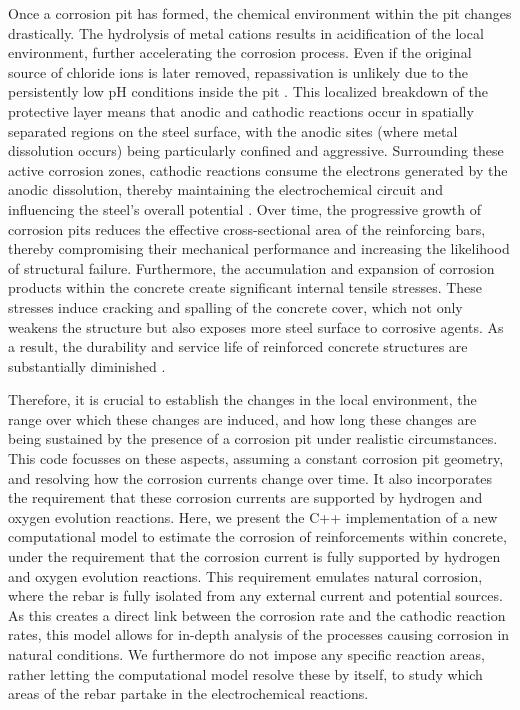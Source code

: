 \documentclass[3p]{elsarticle} %
\begin{document}
Once a corrosion pit has formed, the chemical environment within the pit changes drastically. The hydrolysis of metal cations results in acidification of the local environment, further accelerating the corrosion process. Even if the original source of chloride ions is later removed, repassivation is unlikely due to the persistently low pH conditions inside the pit \citep{Pourbaix1975, Taylor2018a, Li2021a, Turnbull1983, Pickering1972}. This localized breakdown of the protective layer means that anodic and cathodic reactions occur in spatially separated regions on the steel surface, with the anodic sites (where metal dissolution occurs) being particularly confined and aggressive. Surrounding these active corrosion zones, cathodic reactions consume the electrons generated by the anodic dissolution, thereby maintaining the electrochemical circuit and influencing the steel’s overall potential \citep{Hoar1967, Galvele1981, Frankel2017, Frankel1990, Nguyen2021}. Over time, the progressive growth of corrosion pits reduces the effective cross-sectional area of the reinforcing bars, thereby compromising their mechanical performance and increasing the likelihood of structural failure. Furthermore, the accumulation and expansion of corrosion products within the concrete create significant internal tensile stresses. These stresses induce cracking and spalling of the concrete cover, which not only weakens the structure but also exposes more steel surface to corrosive agents. As a result, the durability and service life of reinforced concrete structures are substantially diminished \citep{korec2024phase}.

Therefore, it is crucial to establish the changes in the local environment, the range over which these changes are induced, and how long these changes are being sustained by the presence of a corrosion pit under realistic circumstances. This code focusses on these aspects, assuming a constant corrosion pit geometry, and resolving how the corrosion currents change over time. It also incorporates the requirement that these corrosion currents are supported by hydrogen and oxygen evolution reactions. Here, we present the C++ implementation of a new computational model to estimate the corrosion of reinforcements within concrete, under the requirement that the corrosion current is fully supported by hydrogen and oxygen evolution reactions. This requirement emulates natural corrosion, where the rebar is fully isolated from any external current and potential sources. As this creates a direct link between the corrosion rate and the cathodic reaction rates, this model allows for in-depth analysis of the processes causing corrosion in natural conditions. We furthermore do not impose any specific reaction areas, rather letting the computational model resolve these by itself, to study which areas of the rebar partake in the electrochemical reactions. 
\end{document}
